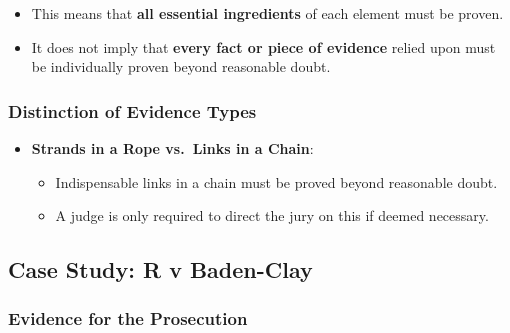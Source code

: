 \begin{itemize}
\tightlist
\item
  This means that \textbf{all essential ingredients} of each element
  must be proven.
\item
  It does not imply that \textbf{every fact or piece of evidence} relied
  upon must be individually proven beyond reasonable doubt.
\end{itemize}

\subsubsection{Distinction of Evidence
Types}\label{distinction-of-evidence-types}

\begin{itemize}
\tightlist
\item
  \textbf{Strands in a Rope vs.~Links in a Chain}:

  \begin{itemize}
  \tightlist
  \item
    Indispensable links in a chain must be proved beyond reasonable
    doubt.
  \item
    A judge is only required to direct the jury on this if deemed
    necessary.
  \end{itemize}
\end{itemize}

\subsection{Case Study: R v
Baden-Clay}\label{case-study-r-v-baden-clay}

\subsubsection{Evidence for the
Prosecution}\label{evidence-for-the-prosecution}


